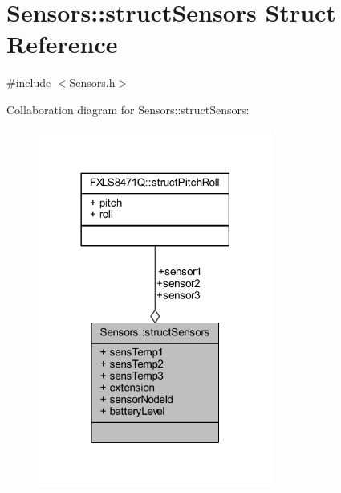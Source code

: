\hypertarget{struct_sensors_1_1struct_sensors}{}\section{Sensors\+:\+:struct\+Sensors Struct Reference}
\label{struct_sensors_1_1struct_sensors}


{\ttfamily \#include $<$Sensors.\+h$>$}



Collaboration diagram for Sensors\+:\+:struct\+Sensors\+:\nopagebreak
\begin{figure}[H]
\begin{center}
\leavevmode
\includegraphics[width=218pt]{struct_sensors_1_1struct_sensors__coll__graph}
\end{center}
\end{figure}
